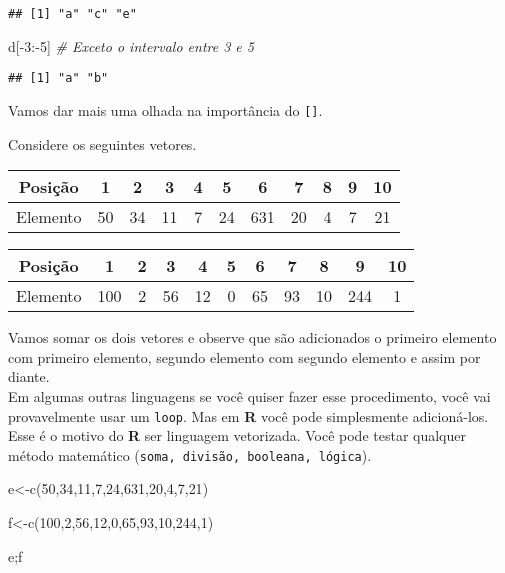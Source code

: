 \documentclass[
]{book}
\newenvironment{Shaded}{\begin{snugshade}}{\end{snugshade}}
\newcommand{\CommentTok}[1]{\textcolor[rgb]{0.56,0.35,0.01}{\textit{#1}}}
\newcommand{\DecValTok}[1]{\textcolor[rgb]{0.00,0.00,0.81}{#1}}
\newcommand{\FunctionTok}[1]{\textcolor[rgb]{0.00,0.00,0.00}{#1}}
\newcommand{\NormalTok}[1]{#1}
\newcommand{\OtherTok}[1]{\textcolor[rgb]{0.56,0.35,0.01}{#1}}
\newcommand{\SpecialCharTok}[1]{\textcolor[rgb]{0.00,0.00,0.00}{#1}}
\begin{document}
\begin{verbatim}
## [1] "a" "c" "e"
\end{verbatim}

\begin{Shaded}
\begin{Highlighting}[]
\NormalTok{d[}\SpecialCharTok{{-}}\DecValTok{3}\SpecialCharTok{:{-}}\DecValTok{5}\NormalTok{] }\CommentTok{\# Exceto o intervalo entre 3 e 5}
\end{Highlighting}
\end{Shaded}

\begin{verbatim}
## [1] "a" "b"
\end{verbatim}

Vamos dar mais uma olhada na importância do \texttt{{[}{]}}.

Considere os seguintes vetores.

\begin{longtable}[]{@{}ccccccccccc@{}}
\toprule
Posição & 1 & 2 & 3 & 4 & 5 & 6 & 7 & 8 & 9 & 10 \\
\midrule
\endhead
Elemento & 50 & 34 & 11 & 7 & 24 & 631 & 20 & 4 & 7 & 21 \\
\bottomrule
\end{longtable}

\begin{longtable}[]{@{}ccccccccccc@{}}
\toprule
Posição & 1 & 2 & 3 & 4 & 5 & 6 & 7 & 8 & 9 & 10 \\
\midrule
\endhead
Elemento & 100 & 2 & 56 & 12 & 0 & 65 & 93 & 10 & 244 & 1 \\
\bottomrule
\end{longtable}

Vamos somar os dois vetores e observe que são adicionados o primeiro elemento com primeiro elemento, segundo elemento com segundo elemento e assim por diante.\\
Em algumas outras linguagens se você quiser fazer esse procedimento, você vai provavelmente usar um \texttt{loop}. Mas em \textbf{R} você pode simplesmente adicioná-los. Esse é o motivo do \textbf{R} ser linguagem vetorizada. Você pode testar qualquer método matemático (\texttt{soma,\ divisão,\ booleana,\ lógica}).

\begin{Shaded}
\begin{Highlighting}[]
\NormalTok{e}\OtherTok{\textless{}{-}}\FunctionTok{c}\NormalTok{(}\DecValTok{50}\NormalTok{,}\DecValTok{34}\NormalTok{,}\DecValTok{11}\NormalTok{,}\DecValTok{7}\NormalTok{,}\DecValTok{24}\NormalTok{,}\DecValTok{631}\NormalTok{,}\DecValTok{20}\NormalTok{,}\DecValTok{4}\NormalTok{,}\DecValTok{7}\NormalTok{,}\DecValTok{21}\NormalTok{)}

\NormalTok{f}\OtherTok{\textless{}{-}}\FunctionTok{c}\NormalTok{(}\DecValTok{100}\NormalTok{,}\DecValTok{2}\NormalTok{,}\DecValTok{56}\NormalTok{,}\DecValTok{12}\NormalTok{,}\DecValTok{0}\NormalTok{,}\DecValTok{65}\NormalTok{,}\DecValTok{93}\NormalTok{,}\DecValTok{10}\NormalTok{,}\DecValTok{244}\NormalTok{,}\DecValTok{1}\NormalTok{)}

\NormalTok{e;f}
\end{Highlighting}
\end{Shaded}
\end{document}
